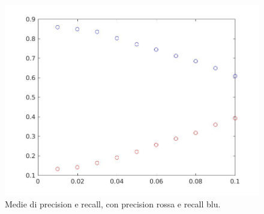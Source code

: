 \documentclass[11pt,a4paper,twoside,openright,titlepage,
                           headinclude,footinclude,BCOR5mm,
                           numbers=noenddot,cleardoublepage=empty,
                           tablecaptionabove]{scrbook}
\begin{document}
\begin{figure}[h!]
\begin{center}
\includegraphics[width=\textwidth]{figs/media_prec.jpg}
\caption{Medie di precision e recall, con precision rossa e recall blu.}
\end{center}
\end{figure}
\newpage
\end{document}
